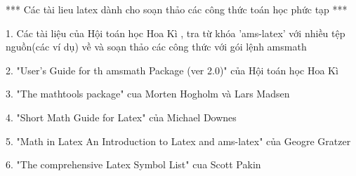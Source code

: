 *** Các tài lieu latex dành cho soạn thảo các công thức toán học phức tạp ***

1. Các tài liệu của Hội toán học Hoa Kì , tra từ khóa 'ams-latex' với nhiều tệp nguồn(các ví dụ) về và soạn thảo các công thức với gói lệnh amsmath

2. "User's Guide for th amsmath Package (ver 2.0)" của Hội toán học Hoa Kì

3. "The mathtools package" cua Morten Hogholm và Lars Madsen 

4. "Short Math Guide for Latex" của Michael Downes

5. "Math in Latex An Introduction to Latex and ams-latex" của Geogre Gratzer

6. "The comprehensive Latex Symbol List" cua Scott Pakin